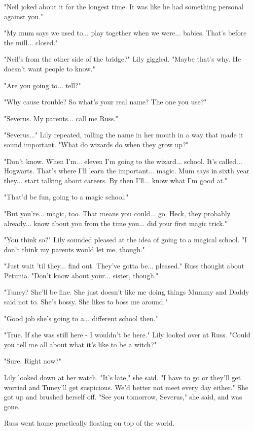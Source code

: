 \documentclass[a4paper,11pt]{article}
\begin{document}
"Neil joked about it for the longest time. It was like he had something personal against you."

"My mum says we used to... play together when we were... babies. That's before the mill... closed."

"Neil's from the other side of the bridge?" Lily giggled. "Maybe that's why. He doesn't want people to know."

"Are you going to... tell?"

"Why cause trouble? So what's your real name? The one you use?"

"Severus. My parents... call me Russ."

"Severus..." Lily repeated, rolling the name in her mouth in a way that made it sound important. "What do wizards do when they grow up?"

"Don't know. When I'm... eleven I'm going to the wizard... school. It's called... Hogwarts. That's where I'll learn the important... magic. Mum says in sixth year they... start talking about careers. By then I'll... know what I'm good at."

"That'd be fun, going to a magic school."

"But you're... magic, too. That means you could... go. Heck, they probably already... know about you from the time you... did your first magic trick."

"You think so?" Lily sounded pleased at the idea of going to a magical school. "I don't think my parents would let me, though."

"Just wait 'til they... find out. They've gotta be... pleased." Russ thought about Petunia. "Don't know about your... sister, though."

"Tuney? She'll be fine. She just doesn't like me doing things Mummy and Daddy said not to. She's bossy. She likes to boss me around."

"Good job she's going to a... different school then."

"True. If she was still here - I wouldn't be here." Lily looked over at Russ. "Could you tell me all about what it's like to be a witch?"

"Sure. Right now?"

Lily looked down at her watch. "It's late," she said. "I have to go or they'll get worried and Tuney'll get suspicious. We'd better not meet every day either." She got up and brushed herself off. "See you tomorrow, Severus," she said, and was gone.

Russ went home practically floating on top of the world.
\end{document}
